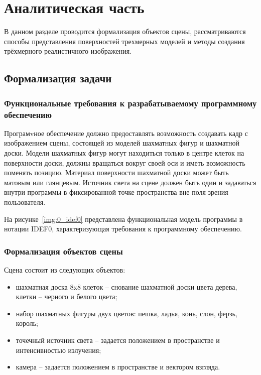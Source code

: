 \chapter{Аналитическая часть}


В данном разделе проводится формализация объектов сцены, рассматриваются способы представления поверхностей трехмерных моделей и методы создания трёхмерного реалистичного изображения.

\section{Формализация задачи}

\subsection{Функциональные требования к разрабатываемому программному обеспечению}

Програмvное обеспечение должно предоставлять возможность создавать кадр с изображением сцены, состоящей из моделей шахматных фигур и шахматной доски. Модели шахматных фигур могут находиться только в центре клеток на поверхности доски, должны вращаться вокруг своей оси и иметь возможность поменять позицию. Материал поверхности шахматной доски может быть матовым или глянцевым. Источник света на сцене должен быть один и задаваться внутри программы в фиксированной точке пространства вне поля зрения пользователя.

На рисунке~\ref{img:0_idef0} представлена функциональная модель программы в нотации IDEF0, характеризующая требования к программному обеспечению.
\FloatBarrier
{}
\FloatBarrier

\subsection{Формализация объектов сцены}
Сцена состоит из следующих объектов:
\begin{itemize}
	\item шахматная доска 8x8 клеток -- снование шахматной доски цвета дерева, клетки -- черного и белого цвета;
	\item набор шахматных фигуры двух цветов: пешка, ладья, конь, слон, ферзь, король;
	\item точечный источник света -- задается положением в пространстве и интенсивностью излучения;
	\item камера -- задается положением в пространстве и вектором взгляда.
\end{itemize}

